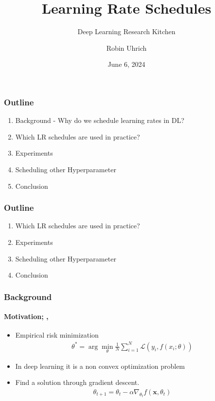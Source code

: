 \documentclass[10pt,aspectratio=169]{beamer}
\title[Learning Rate Schedules]{Learning Rate Schedules}
\subtitle{Deep Learning Research Kitchen}
\author[R. Uhrich]{Robin Uhrich}
\institute{}
\date[06.06.2024]{June 6, 2024}
\begin{document}
    \begin{frame}[plain]
        \titlepage
    \end{frame}

    \begin{darkframe}
        \frametitle{Outline}
        \begin{enumerate}
            \item Background - Why do we schedule learning rates in DL?
            \item Which LR schedules are used in practice?
            \item Experiments
            \item Scheduling other Hyperparameter
            \item Conclusion
        \end{enumerate}
    \end{darkframe}

    \begin{darkframe}
        \frametitle{Outline}

        \begin{enumerate}
            \addtolength{\itemindent}{0.7cm}
            \addtolength{\itemindent}{-0.7cm}
            \item Which LR schedules are used in practice?
            \item Experiments
            \item Scheduling other Hyperparameter
            \item Conclusion
        \end{enumerate}

    \end{darkframe}

    \begin{frame}
        \frametitle{Background}
        \framesubtitle{Motivation; \cite{pml1Book}, \cite{goodfellow2016deep}}
        \begin{itemize}
            \item Empirical risk minimization
                \begin{align*}
                    \theta^* = \arg\min_\theta \frac{1}{N} \sum_{i=1}^N
                    \mathcal{L}(y_i, f(x_i; \theta))
                \end{align*}
            \item In deep learning it is a non convex optimization problem
            \item Find a solution through gradient descent.
                \begin{align*}
                    \theta_{t + 1} = \theta_t - \alpha \nabla_{\theta_t} f(\boldsymbol{x}, \theta_t)
                \end{align*}
        \end{itemize}
    \end{frame}
\end{document}
